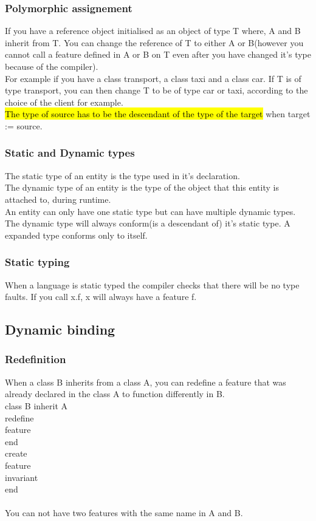 \documentclass[11pt]{article}
\newcommand\tab[1][1cm]{\hspace*{#1}}
\begin{document}
\subsubsection{Polymorphic assignement}
If you have a reference object initialised as an object of type T where, A and B inherit from T. You can change the reference of T to either A or B(however you cannot call a feature defined in A or B on T even after you have changed it's type because of the compiler).\\For example if you have a class transport, a class taxi and a class car. If T is of type transport, you can then change T to be of type car or taxi, according to the choice of the client for example.\\\hl{The type of source has to be the descendant of the type of the target} when target := source.
\subsubsection{Static and Dynamic types}
The static type of an entity is the type used in it's declaration.\\The dynamic type of an entity is the type of the object that this entity is attached to, during runtime.\\An entity can only have one static type but can have multiple dynamic types.\\The dynamic type will always conform(is a descendant of) it's static type. A expanded type conforms only to itself.
\subsubsection{Static typing}
When a language is static typed the compiler checks that there will be no type faults. If you call x.f, x will always have a feature f.
\subsection{Dynamic binding}
\subsubsection{Redefinition}
When a class B inherits from a class A, you can redefine a feature that was already declared in the class A to function differently in B.\\class B inherit A\\\tab redefine\\\tab\tab feature\\\tab end\\create\\feature\\invariant\\end\\\\You can not have two features with the same name in A and B.
\end{document}
